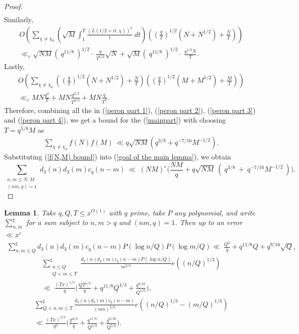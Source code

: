 \documentclass[oneside,reqno,10pt]{amsart}
\numberwithin{equation}{section}
\theoremstyle{plain}
\newtheorem{lemma}{Lemma}
\theoremstyle{definition}
\numberwithin{equation}{section}
\begin{document}
\begin{proof}
\begin{multline}
\end{multline}
Similarly, 
\begin{multline}\label{peron part 3}
      O\left( \sum_{\chi \neq \chi_0} \left(\sqrt{M} \int_{1}^T \frac{\left(L(1/2+it,\chi)\right)^3}{t}\  dt\right) \left( \left(\frac{q}{T}\right)^{1/2} (N+N^{1/2})+\frac{N}{T}\right)\right)\\
      \ll_{\varepsilon} \sqrt{NM} (\ q^{11/8}\ )^{1/2}\cdot\ \frac{q}{T^{1/2}}\sqrt{N} + \sqrt{M}(\ q^{11/8}\ )^{1/2} \cdot\ \frac{q^{1/2}N}{T}.
\end{multline}
Lastly,
\begin{multline}\label{peron part 4}
    O\left( \sum_{\chi\neq \chi_0} \left(\left(\frac{q}{T}\right)^{1/2} (N+N^{1/2})+\frac{N}{T}\right)\left(\left(\frac{q}{T}\right)^{1/2} (M+M^{1/2})+\frac{M}{T}\right)\right)\\
    \ll_{\varepsilon} MN\frac{q^2}{T}+MN\frac{q^{2/3}}{T^{2/3}}+MN\frac{q}{T^2}.
\end{multline}
Therefore, combining all the in (\ref{peron part 1}), (\ref{peron part 2}), (\ref{peron part 3}) and (\ref{peron part 4}), we get a bound for the (\ref{mainpart})  with choosing $T=q^{5/8} M$ as
\begin{align}\label{f(N,M) bound}
    \sum_{\chi\neq \chi_0} f(N)f(M)\ \ll q\sqrt{NM} \left(q^{3/8}+q^{-7/16}M^{-1/2}\right).
\end{align}
Substituting (\ref{f(N,M) bound}) into (\ref{goal of the main lemma}), we obtain
\begin{equation*}
    \sum_{\substack{n,m\leq N, M\\(nm,q)=1}} d_3(n) d_3(m) c_q(n-m) \ \ll \ (NM)^\varepsilon \Big( \frac{NM}{q}+ q\sqrt{NM}\ (\ q^{3/8}\ +\ q^{-7/16}M^{-1/2}\ ) \Big).
\end{equation*}
\end{proof}
\begin{lemma}\label{lemma9}
    Take $q,Q,T\leq x^{O(1)}$ with $q$ prime, take $P$ any polynomial, and write $\sum_{n,m}^{\sharp}$ for a sum subject to $n,m>q$ and $(nm,q)=1$. Then up to an error $\ll x^{\varepsilon}$
\begin{multline*}
    \sum_{n,m \leq Q}^{\sharp} d_{3}(n)d_{3}(m)c_{q}(n-m)P(\log n/Q)P(\log m/Q) \ll\ \frac{Q^2}{q}+q^{11/8}Q+q^{9/16}\sqrt{Q},
    \end{multline*}
    \begin{multline*}
    \sum_{\substack{n\leq Q\\Q < m \leq T}}^{\sharp} \frac{d_{3}(n)d_{3}(m)c_{q}(n-m)P(\log n/Q)}{m^{2/3}} e\left((n/Q)^{1/3}\right)\\ \ll\  \frac{(Tx)^{1/3}}{q}\Big( \frac{QT^{1/3}}{q}+q^{11/8}Q^{1/3}+\frac{q^{9/16}}{Q^{1/6}}\Big),    
    \end{multline*}
    \begin{multline*}
    \sum_{Q < n,m \leq T}^{\sharp} \frac{d_{3}(n)d_{3}(m)c_{q}(n-m)}{(nm)^{2/3}} e\left((n/Q)^{1/3} - (m/Q)^{1/3}\right)\\ \ll \frac{(Tx)^{2/3}}{q^2} \Big( \frac{T^{2/3}}{q}+\frac{q^{11/8}}{Q^{1/3}}+\frac{q^{9/16}}{Q^{5/6}}\Big).
\end{multline*}
\end{lemma}
\end{document}
